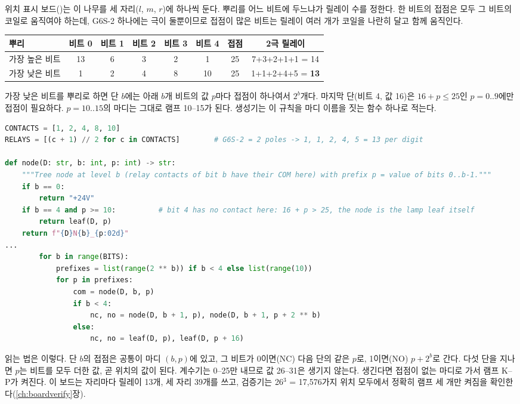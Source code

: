 \Ours 위치 표시 보드()는 이 나무를 세 자리($l$, $m$, $r$)에 하나씩 둔다.
뿌리를 어느 비트에 두느냐가 릴레이 수를 정한다. 한 비트의 접점은 모두 그 비트의 코일로 움직여야 하는데,
G6S-2 하나에는 극이 둘뿐이므로 접점이 많은 비트는 릴레이 여러 개가 코일을 나란히 달고 함께 움직인다.

\begin{center}
\small
\begin{tabular}{lccccccc}
\toprule
뿌리 & 비트 0 & 비트 1 & 비트 2 & 비트 3 & 비트 4 & 접점 & 2극 릴레이 \\
\midrule
가장 높은 비트 & 13 & 6 & 3 & 2 & 1 & 25 & 7+3+2+1+1 = 14 \\
가장 낮은 비트 & 1 & 2 & 4 & 8 & 10 & 25 & 1+1+2+4+5 = \textbf{13} \\
\bottomrule
\end{tabular}
\end{center}

가장 낮은 비트를 뿌리로 하면 단 $b$에는 아래 $b$개 비트의 값 $p$마다 접점이 하나여서 $2^b$개다. 마지막 단(비트
4, 값 16)은 $16+p \le 25$인 $p = 0..9$에만 접점이 필요하다. $p = 10..15$의 마디는 그대로 램프 10--15가 된다.
생성기는 이 규칙을 마디 이름을 짓는 함수 하나로 적는다.

\begin{lstlisting}[language=Python,caption={\code{gen\_display.py}: 나무의 마디와 접점. 마디 이름에 ``지금까지 지나온 비트의 값'' $p$가 들어 있다.},label={lst:r-tree}]
CONTACTS = [1, 2, 4, 8, 10]
RELAYS = [(c + 1) // 2 for c in CONTACTS]        # G6S-2 = 2 poles -> 1, 1, 2, 4, 5 = 13 per digit

def node(D: str, b: int, p: int) -> str:
    """Tree node at level b (relay contacts of bit b have their COM here) with prefix p = value of bits 0..b-1."""
    if b == 0:
        return "+24V"
    if b == 4 and p >= 10:          # bit 4 has no contact here: 16 + p > 25, the node is the lamp leaf itself
        return leaf(D, p)
    return f"{D}N{b}_{p:02d}"
...
        for b in range(BITS):
            prefixes = list(range(2 ** b)) if b < 4 else list(range(10))
            for p in prefixes:
                com = node(D, b, p)
                if b < 4:
                    nc, no = node(D, b + 1, p), node(D, b + 1, p + 2 ** b)
                else:
                    nc, no = leaf(D, p), leaf(D, p + 16)
\end{lstlisting}

읽는 법은 이렇다. 단 $b$의 접점은 공통이 마디 $(b, p)$에 있고, 그 비트가 0이면(NC) 다음 단의 같은 $p$로,
1이면(NO) $p + 2^b$로 간다. 다섯 단을 지나면 $p$는 비트를 모두 더한 값, 곧 위치의 값이 된다. 계수기는 0--25만
내므로 값 26--31은 생기지 않는다. 생긴다면 접점이 없는 마디로 가서 램프 K--P가 켜진다. 이 보드는 자리마다
릴레이 13개, 세 자리 39개를 쓰고, 검증기는 26$^3$ = 17,576가지 위치 모두에서 정확히 램프 세 개만 켜짐을
확인한다(\ref{ch:boardverify}장).


